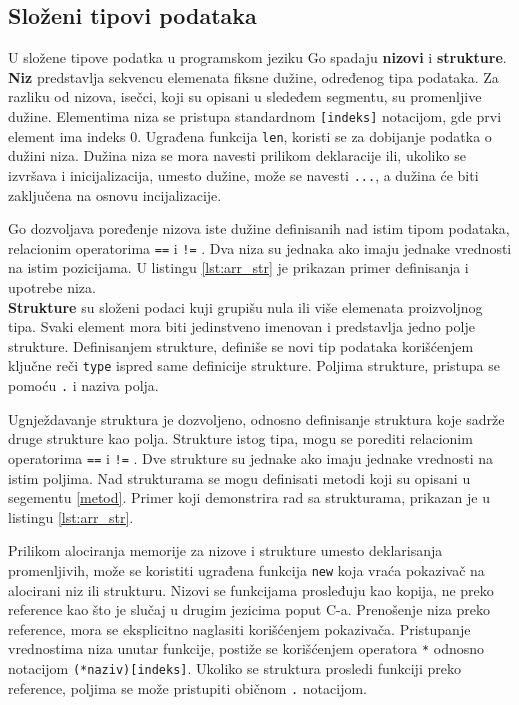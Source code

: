 \documentclass[12pt,oneside]{memoir}
\begin{document}
\subsection{Složeni tipovi podataka}
U složene tipove podatka u programskom jeziku Go spadaju \textbf{nizovi} i \textbf{strukture}.
\\

\textbf{Niz} predstavlja sekvencu elemenata fiksne dužine, određenog tipa podataka. Za razliku od nizova, isečci, koji su opisani u sledeđem segmentu, su promenljive dužine. Elementima niza se pristupa standardnom \texttt{[indeks]} notacijom, gde prvi element ima indeks 0. Ugrađena funkcija \texttt{len}, koristi se za dobijanje podatka o dužini niza. Dužina niza se mora navesti prilikom deklaracije ili, ukoliko se izvršava i inicijalizacija, umesto dužine, može se navesti \texttt{...}, a dužina će biti zaključena na osnovu incijalizacije.

Go dozvoljava poređenje nizova iste dužine definisanih nad istim tipom podataka, relacionim operatorima \texttt{==} i \texttt{!=} . Dva niza su jednaka ako imaju jednake vrednosti na istim pozicijama. U listingu \ref{lst:arr_str} je prikazan primer definisanja i upotrebe niza.
\\

\textbf{Strukture} su složeni podaci kuji grupišu nula ili više elemenata proizvoljnog tipa. Svaki element mora biti jedinstveno imenovan i predstavlja jedno polje strukture. Definisanjem strukture, definiše se novi tip podataka korišćenjem ključne reči \texttt{type} ispred same definicije strukture. Poljima strukture, pristupa se pomoću \texttt{.} i naziva polja. 

Ugnježdavanje struktura je dozvoljeno, odnosno definisanje struktura koje sadrže druge strukture kao polja. Strukture istog tipa, mogu se porediti relacionim operatorima   \texttt{==} i \texttt{!=} . Dve strukture su jednake ako imaju jednake vrednosti na istim poljima. Nad strukturama se mogu definisati metodi koji su opisani u segementu \ref{metod}. Primer koji demonstrira rad sa strukturama, prikazan je u listingu  \ref{lst:arr_str}.

Prilikom alociranja memorije za nizove i strukture umesto deklarisanja promenljivih, može se koristiti ugrađena funkcija \texttt{new} koja vraća pokazivač na alocirani niz ili strukturu. Nizovi se funkcijama prosleđuju kao kopija, ne preko reference kao što je slučaj u drugim jezicima poput C-a. Prenošenje niza preko reference, mora se eksplicitno naglasiti korišćenjem pokazivača. Pristupanje vrednostima niza unutar funkcije, postiže se korišćenjem operatora \texttt{*} odnosno notacijom \texttt{(*naziv)[indeks]}. Ukoliko se struktura prosledi funkciji preko reference, poljima se može pristupiti običnom \texttt{.} notacijom.
\end{document}

